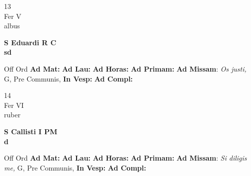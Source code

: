\documentclass[10pt, openany]{book}
\begin{document}
        \begin{center}
            \begin{minipage}{3.5in}
                \vspace{2em}
                \begin{minipage}{0.5in}
                    {\Huge 13} \\
                    {\normalsize Fer V} \\
                    {\normalsize albus}
                \end{minipage}
                \begin{minipage}{3.0in}
                    \textbf{ \large S Eduardi R C \\
                    \textnormal{\normalsize sd}} \\ 
                \end{minipage}
                \begin{justify}Off Ord
                    \textbf{Ad Mat: }
                    \textbf{Ad Lau: }
                    \textbf{Ad Horas: }
                    \textbf{Ad Primam: }\textbf{Ad Missam}: \textit{Os justi,} G, Pre Communis,  
                    \textbf{In Vesp: }
                    \textbf{Ad Compl: }
                \end{justify}
            \end{minipage}
        \end{center}
    
        \begin{center}
            \begin{minipage}{3.5in}
                \vspace{2em}
                \begin{minipage}{0.5in}
                    {\Huge 14} \\
                    {\normalsize Fer VI} \\
                    {\normalsize ruber}
                \end{minipage}
                \begin{minipage}{3.0in}
                    \textbf{ \large S Callisti I PM \\
                    \textnormal{\normalsize d}} \\ 
                \end{minipage}
                \begin{justify}Off Ord
                    \textbf{Ad Mat: }
                    \textbf{Ad Lau: }
                    \textbf{Ad Horas: }
                    \textbf{Ad Primam: }\textbf{Ad Missam}: \textit{Si diligis me,} G, Pre Communis,  
                    \textbf{In Vesp: }
                    \textbf{Ad Compl: }
                \end{justify}
            \end{minipage}
        \end{center}
    
\end{document}

